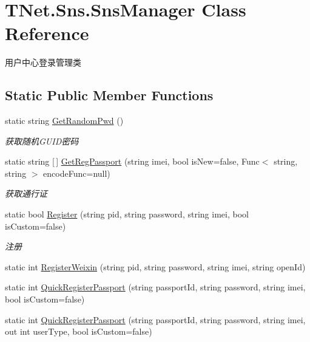 \hypertarget{class_t_net_1_1_sns_1_1_sns_manager}{}\section{T\+Net.\+Sns.\+Sns\+Manager Class Reference}
\label{class_t_net_1_1_sns_1_1_sns_manager}


用户中心登录管理类  


\subsection*{Static Public Member Functions}
\begin{DoxyCompactItemize}
\item 
static string \mbox{\hyperlink{class_t_net_1_1_sns_1_1_sns_manager_a54742e73031a8061b08022f463b933bf}{Get\+Random\+Pwd}} ()
\begin{DoxyCompactList}\small\item\em 获取随机\+G\+U\+I\+D密码 \end{DoxyCompactList}\item 
static string \mbox{[}$\,$\mbox{]} \mbox{\hyperlink{class_t_net_1_1_sns_1_1_sns_manager_aded1d06b617c84350ad0e164b77a91d4}{Get\+Reg\+Passport}} (string imei, bool is\+New=false, Func$<$ string, string $>$ encode\+Func=null)
\begin{DoxyCompactList}\small\item\em 获取通行证 \end{DoxyCompactList}\item 
static bool \mbox{\hyperlink{class_t_net_1_1_sns_1_1_sns_manager_ae23b4b2c994c201985f596d2da981694}{Register}} (string pid, string password, string imei, bool is\+Custom=false)
\begin{DoxyCompactList}\small\item\em 注册 \end{DoxyCompactList}\item 
static int \mbox{\hyperlink{class_t_net_1_1_sns_1_1_sns_manager_afdcc8f75a537a331b4d44ef121e215f9}{Register\+Weixin}} (string pid, string password, string imei, string open\+Id)
\item 
static int \mbox{\hyperlink{class_t_net_1_1_sns_1_1_sns_manager_aa0b358b47bbac33d65c5cb2be6f741e5}{Quick\+Register\+Passport}} (string passport\+Id, string password, string imei, bool is\+Custom=false)
\item 
static int \mbox{\hyperlink{class_t_net_1_1_sns_1_1_sns_manager_a63371665f4331ea04ecd498ef3c1bc86}{Quick\+Register\+Passport}} (string passport\+Id, string password, string imei, out int user\+Type, bool is\+Custom=false)

\end{DoxyCompactItemize}
